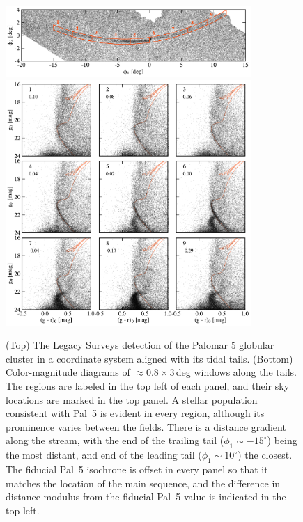 \documentclass[twocolumn]{aastex62}
\newcommand{\sa}[1]{{\color{magenta} SP: #1}}
\begin{document}
\begin{figure}
\begin{center}
\includegraphics[width=0.83\textwidth]{fig1_a_map.pdf}
\includegraphics[width=0.83\textwidth]{fig1_b_cmds.pdf}
\end{center}
\caption{
(Top) The Legacy Surveys detection of the Palomar 5 globular cluster in a coordinate system aligned with its tidal tails.
(Bottom) Color-magnitude diagrams of $\approx0.8\times3$\,deg windows along the tails.
The regions are labeled in the top left of each panel, and their sky locations are marked in the top panel.
A stellar population consistent with Pal~5 is evident in every region, although its prominence varies between the fields.
There is a distance gradient along the stream, with the end of the trailing tail ($\phi_1\sim-15^\circ$) being the most distant, and end of the leading tail ($\phi_1\sim10^\circ$) the closest.
The fiducial Pal~5 isochrone is offset in every panel so that it matches the location of the main sequence, and the difference in distance modulus from the fiducial Pal~5 value is indicated in the top left.
}
\label{fig:cmds}
\end{figure}
\end{document}
